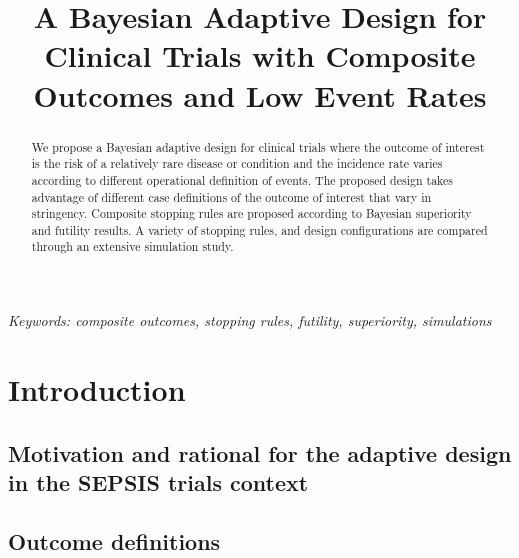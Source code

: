 \documentclass[12pt]{article}
\title{A Bayesian Adaptive Design for Clinical Trials with Composite Outcomes and Low Event Rates}
\date{}
\begin{document}
	
{\linespread{1.5}	
	\maketitle


\begin{abstract}
We propose a Bayesian adaptive design for clinical trials where the outcome of interest is the risk of a relatively rare disease or condition and the incidence rate varies according to different operational definition of events. The proposed design takes advantage of different case definitions of the outcome of interest that vary in stringency. Composite stopping rules are proposed according to Bayesian superiority and futility results. A variety of stopping rules, and design configurations are compared through an extensive simulation study.
\end{abstract}

\noindent%
{\it Keywords: composite outcomes, stopping rules, futility, superiority, simulations}  

}
\section{Introduction}
\label{sec:intro}
\subsection{Motivation and rational for the adaptive design in the SEPSIS trials context
}
\subsection{Outcome definitions
}
\end{document}
